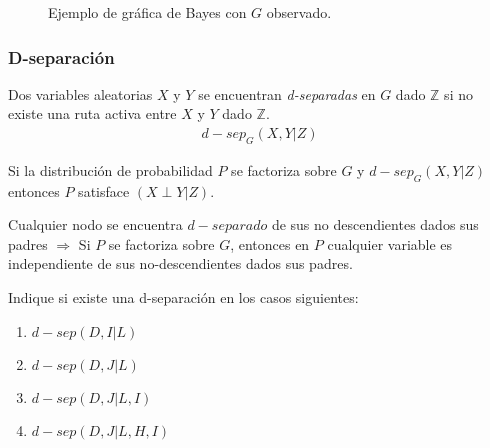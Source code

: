 \begin{figure}
\begin{center}
\end{center}
\caption{Ejemplo de gráfica de Bayes con $G$ observado.}\label{fig:senderosActivos}
\end{figure}

\subsubsection{D-separación}

\begin{definition}
 Dos variables aleatorias $X$ y $Y$ se encuentran \emph{d-separadas} en $G$ dado $\mathbb{Z}$ si no existe una ruta activa entre $X$ y $Y$ dado $\mathbb{Z}$.
 \begin{align}
  d-sep_G(X,Y|Z)
 \end{align}
\end{definition}

\begin{theorem}
 Si la distribución de probabilidad $P$ se factoriza sobre $G$ y $d-sep_G(X,Y|Z)$ entonces $P$ satisface $(X \perp Y | Z)$.
\end{theorem}

Cualquier nodo se encuentra $d-separado$ de sus no descendientes dados sus padres $\Rightarrow$ Si $P$ se factoriza sobre $G$, entonces en $P$ cualquier variable es independiente de sus no-descendientes dados sus padres.


\begin{example}
 Indique si existe una d-separación en los casos siguientes:
 \begin{enumerate}
  \item $d-sep(D,I|L)$
  \item $d-sep(D,J|L)$
  \item $d-sep(D,J|L,I)$ \gtick
  \item $d-sep(D,J|L,H,I)$
 \end{enumerate}

\end{example}

